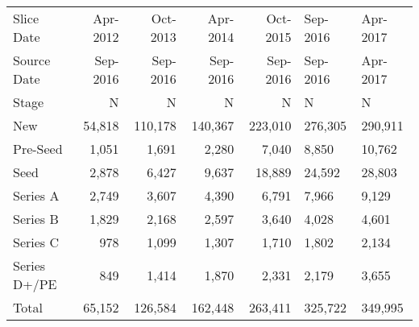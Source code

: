 \begin{tabular}{lrrrr} \toprule
Slice Date      & Apr-2012  & Oct-2013  & Apr-2014  & Oct-2015  & Sep-2016  & Apr-2017  \\
Source Date     & Sep-2016  & Sep-2016  & Sep-2016  & Sep-2016  & Sep-2016  & Apr-2017  \\
Stage           & N         & N         & N         & N         & N         & N         \\ \midrule
New             & 54,818    & 110,178   & 140,367   & 223,010   & 276,305   & 290,911   \\
Pre-Seed        & 1,051     & 1,691     & 2,280     & 7,040     & 8,850     & 10,762    \\
Seed            & 2,878     & 6,427     & 9,637     & 18,889    & 24,592    & 28,803    \\
Series A        & 2,749     & 3,607     & 4,390     & 6,791     & 7,966     & 9,129     \\
Series B        & 1,829     & 2,168     & 2,597     & 3,640     & 4,028     & 4,601     \\
Series C        & 978       & 1,099     & 1,307     & 1,710     & 1,802     & 2,134     \\
Series D+/PE    & 849       & 1,414     & 1,870     & 2,331     & 2,179     & 3,655     \\
Total           & 65,152    & 126,584   & 162,448   & 263,411   & 325,722   & 349,995   \\
\bottomrule \end{tabular}
